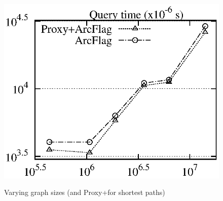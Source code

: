 \begin{figure}[tb!]
\begin{center}
{\includegraphics[scale=0.422]{./exp/query_q7_path_af.eps}}
\end{center}
\vspace{-0.5ex}
\caption{Varying graph sizes (\arcflag and Proxy+\arcflag for shortest paths)}
\label{fig:performance_path_graph_size_af}
\vspace{-1ex}
\end{figure}

